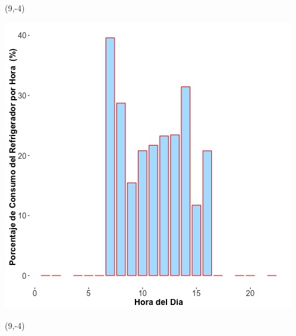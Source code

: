 \documentclass{article}\usepackage[]{graphicx}\usepackage[]{color}
\newenvironment{knitrout}{}{} %
\begin{document}
 \begin{textblock}{1}(9,-4)
\begin{minipage}{20em}
\begingroup

\endgroup
\end{minipage}
\end{textblock}

 \vspace{2cm}

\begin{knitrout}
\color{fgcolor}
\includegraphics[scale=0.65]{figure/A28_fridge_energy_pct.jpg} 
\end{knitrout}

 \begin{textblock}{1}(9,-4)
\begin{minipage}{20em}
\begingroup

\endgroup
\end{minipage}
\end{textblock}

\vspace{20cm}
\end{document}
